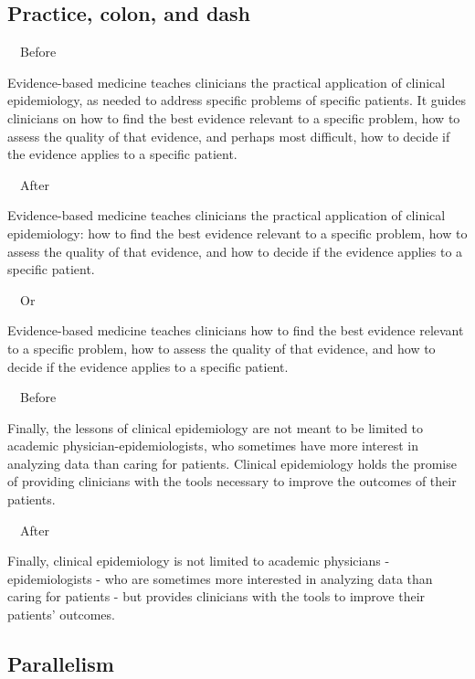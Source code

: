 \documentclass[a4paper, 12pt]{article}
\begin{document}
\subsection{Practice, colon, and dash}

\par\ \textbullet\ Before
\par Evidence-based medicine teaches clinicians the practical application of clinical epidemiology, as needed to address specific problems of specific patients. It guides clinicians on how to find the best evidence relevant to a specific problem, how to assess the quality of that evidence, and perhaps most difficult, how to decide if the evidence applies to a specific patient.

\par\ \textbullet\ After
\par Evidence-based medicine teaches clinicians the practical application of clinical epidemiology: how to find the best evidence relevant to a specific problem, how to assess the quality of that evidence, and how to decide if the evidence applies to a specific patient.

\par\ \textbullet\ Or
\par Evidence-based medicine teaches clinicians how to find the best evidence relevant to a specific problem, how to assess the quality of that evidence, and how to decide if the evidence applies to a specific patient.

\newpage\par\ \textbullet\ Before
\par Finally, the lessons of clinical epidemiology are not meant to be limited to academic physician-epidemiologists, who sometimes have more interest in analyzing data than caring for patients. Clinical epidemiology holds the promise of providing clinicians with the tools necessary to improve the outcomes of their patients.

\par\ \textbullet\ After
\par Finally, clinical epidemiology is not limited to academic physicians - epidemiologists - who are sometimes more interested in analyzing data than caring for patients - but provides clinicians with the tools to improve their patients' outcomes.

\subsection{Parallelism}
\end{document}
